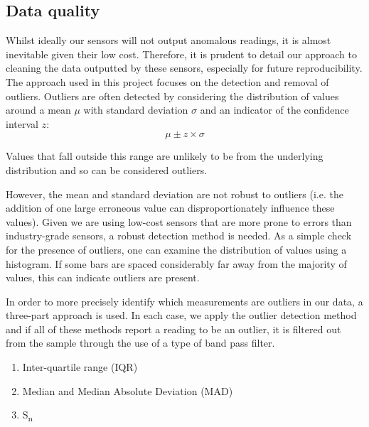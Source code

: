 \documentclass[11pt,twosided,a4paper]{report}
\begin{document}
\subsection{Data quality} \label{data_quality}


Whilst ideally our sensors will not output anomalous readings, it is almost inevitable given their low cost. Therefore, it is prudent to detail our approach to cleaning the data outputted by these sensors, especially for future reproducibility. The approach used in this project focuses on the detection and removal of outliers. Outliers are often detected by considering the distribution of values around a mean $\mu$ with standard deviation $\sigma$ and an indicator of the confidence interval $z$:
\begin{equation}
\mu \pm z \times \sigma
\end{equation}

Values that fall outside this range are unlikely to be from the underlying distribution and so can be considered outliers.

However, the mean and standard deviation are not robust to outliers (i.e. the addition of one large erroneous value can disproportionately influence these values). Given we are using low-cost sensors that are more prone to errors than industry-grade sensors, a robust detection method is needed. As a simple check for the presence of outliers, one can examine the distribution of values using a histogram. If some bars are spaced considerably far away from the majority of values, this can indicate outliers are present.

In order to more precisely identify which measurements are outliers in our data, a three-part approach is used. In each case, we apply the outlier detection method and if all of these methods report a reading to be an outlier, it is filtered out from the sample through the use of a type of band pass filter.
\begin{enumerate}
\item Inter-quartile range (IQR)
\item Median and Median Absolute Deviation (MAD)
\item S\textsubscript{n}
\end{enumerate}
\end{document}
